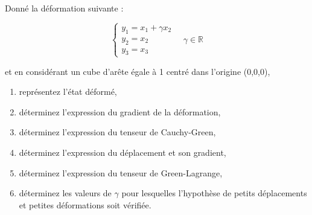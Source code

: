 \documentclass
[
a4paper,                      %
twoside,					  %
12pt,                         %
abstract,		      %
fleqn,                        %
]
{scrartcl} %
\begin{document}
Donn\'e la d\'eformation suivante : 

\begin{equation}
\begin{cases}
y_{1}=x_{1}+\gamma x_{2}\\
y_{2}=x_{2}\\
y_{3}=x_{3}
\end{cases}\quad \gamma\in\mathbb{R}
\end{equation}

et en consid\'erant un cube d'ar\^ete \'egale \`a 1 centr\'e dans l'origine (0,0,0),

\begin{enumerate}
\item repr\'esentez l'\'etat d\'eform\'e,
\item d\'eterminez l'expression du gradient de la d\'eformation,
\item d\'eterminez l'expression du tenseur de Cauchy-Green,
\item d\'eterminez l'expression du d\'eplacement et son gradient,
\item d\'eterminez l'expression du tenseur de Green-Lagrange,
\item d\'eterminez les valeurs de $\gamma$ pour lesquelles l'hypoth\`ese de petits d\'eplacements et petites d\'eformations soit v\'erifi\'ee. 
\end{enumerate}


%


%
%
%


%
%
\end{document}
